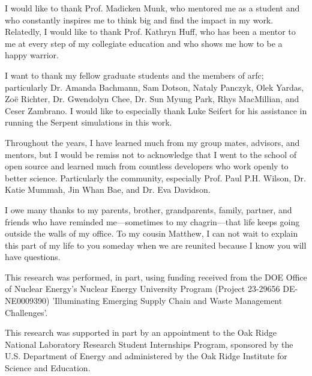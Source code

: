 I would like to thank Prof. Madicken Munk, who mentored me as a student and who
constantly inspires me to think big and find the impact in my work. Relatedly,
I would like to thank Prof. Kathryn Huff, who has been a mentor to me at every
step of my collegiate education and who shows me how to be a happy warrior.

I want to thank my fellow graduate students and the members of
\gls{arfc}; particularly Dr. Amanda Bachmann, Sam Dotson, Nataly Panczyk, Olek
Yardas, Zo\"{e} Richter, Dr. Gwendolyn Chee, Dr. Sun Myung Park, Rhys
MacMillian, and Ceser Zambrano. I would like to especially thank Luke Seifert
for his assistance in running the Serpent simulations in this work.

Throughout the years, I have learned much from my group mates, advisors, and
mentors, but I would be remiss not to acknowledge that I went to the school of
open source and learned much from countless developers who work openly to
better science. Particularly the \cyclus community, especially Prof. Paul P.H.
Wilson, Dr. Katie Mummah, Jin Whan Bae, and Dr. Eva Davidson.

I owe many thanks to my parents, brother, grandparents, family, partner, and
friends who have reminded me---sometimes to my chagrin---that life keeps going
outside the walls of my office. To my cousin Matthew, I can not wait to explain
this part of my life to you someday when we are reunited because I know you
will have questions.

This research was performed, in part, using funding received from the DOE
Office of Nuclear Energy's Nuclear Energy University Program (Project 23-29656
DE-NE0009390) 'Illuminating Emerging Supply Chain and Waste Management
Challenges'.

This research was supported in part by an appointment to the Oak Ridge National
Laboratory Research Student Internships Program, sponsored by the U.S.
Department of Energy and administered by the Oak Ridge Institute for Science
and Education.